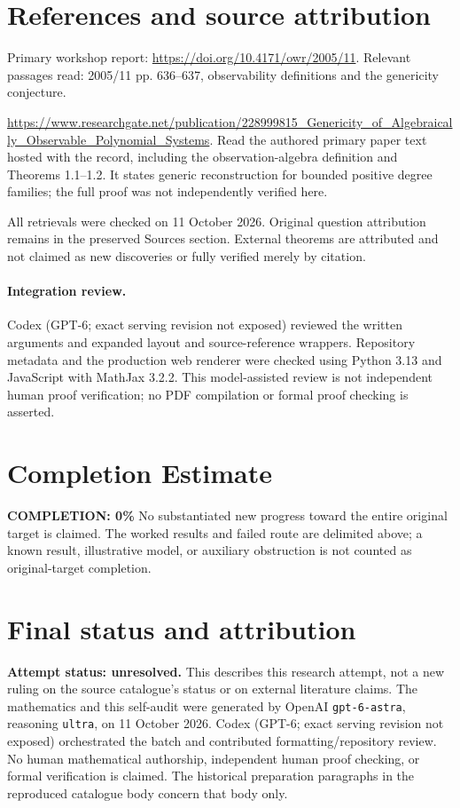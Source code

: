 \documentclass[11pt]{article}
\begin{document}
\section{References and source attribution}
Primary workshop report: \url{https://doi.org/10.4171/owr/2005/11}. Relevant passages read: 2005/11 pp. 636--637, observability definitions and the genericity conjecture.

\url{https://www.researchgate.net/publication/228999815_Genericity_of_Algebraically_Observable_Polynomial_Systems}. Read the authored primary paper text hosted with the record, including the observation-algebra definition and Theorems 1.1--1.2. It states generic reconstruction for bounded positive degree families; the full proof was not independently verified here.

All retrievals were checked on 11 October 2026. Original question attribution remains in the preserved Sources section. External theorems are attributed and not claimed as new discoveries or fully verified merely by citation.


\paragraph{Integration review.} Codex (GPT-6; exact serving revision not exposed) reviewed the written arguments and expanded layout and source-reference wrappers. Repository metadata and the production web renderer were checked using Python 3.13 and JavaScript with MathJax 3.2.2. This model-assisted review is not independent human proof verification; no PDF compilation or formal proof checking is asserted.

\section{Completion Estimate}
\noindent\textbf{COMPLETION: 0\%}
No substantiated new progress toward the entire original target is claimed. The worked results and failed route are delimited above; a known result, illustrative model, or auxiliary obstruction is not counted as original-target completion.

\section{Final status and attribution}
\textbf{Attempt status: unresolved.} This describes this research attempt, not a new ruling on the source catalogue's status or on external literature claims.
The mathematics and this self-audit were generated by OpenAI \texttt{gpt-6-astra}, reasoning \texttt{ultra}, on 11 October 2026. Codex (GPT-6; exact serving revision not exposed) orchestrated the batch and contributed formatting/repository review. No human mathematical authorship, independent human proof checking, or formal verification is claimed. The historical preparation paragraphs in the reproduced catalogue body concern that body only.
\end{document}

